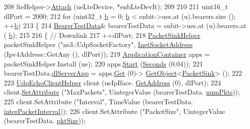 \begin{DoxyCode}
208           lteHelper->\hyperlink{classns3_1_1LteHelper_a9466743f826aa2652a87907b7f0a1c87}{Attach} (ueLteDevice, *enbLteDevIt);        
209       
210   
211           uint16\_t dlPort = 2000;          
212           \textcolor{keywordflow}{for} (uint32\_t \hyperlink{buildings__pathloss_8m_a21ad0bd836b90d08f4cf640b4c298e7c}{b} = 0; \hyperlink{buildings__pathloss_8m_a21ad0bd836b90d08f4cf640b4c298e7c}{b} < enbit->ues.at (u).bearers.size (); ++\hyperlink{buildings__pathloss_8m_a21ad0bd836b90d08f4cf640b4c298e7c}{b})
213             \{              
214               \hyperlink{structBearerTestData}{BearerTestData}& bearerTestData = enbit->ues.at (u).bearers.at (
      \hyperlink{buildings__pathloss_8m_a21ad0bd836b90d08f4cf640b4c298e7c}{b});
215               
216               \{ \textcolor{comment}{// Downlink}
217                 ++dlPort;
218                 \hyperlink{classns3_1_1PacketSinkHelper}{PacketSinkHelper} packetSinkHelper (\textcolor{stringliteral}{"ns3::UdpSocketFactory"}, 
      \hyperlink{classns3_1_1InetSocketAddress}{InetSocketAddress} (Ipv4Address::GetAny (), dlPort));
219                 \hyperlink{classns3_1_1ApplicationContainer}{ApplicationContainer} apps = packetSinkHelper.Install (ue);
220                 apps.\hyperlink{classns3_1_1ApplicationContainer_a8eff87926507020bbe3e1390358a54a7}{Start} (\hyperlink{group__timecivil_ga33c34b816f8ff6628e33d5c8e9713b9e}{Seconds} (0.04));
221                 bearerTestData.\hyperlink{structBearerTestData_a6a731d0528d513813da7c22c1d1e38c6}{dlServerApp} = apps.\hyperlink{classns3_1_1ApplicationContainer_a9e565807abd4213a56566a7ccd8d7509}{Get} (0)->
      \hyperlink{classns3_1_1Object_a13e18c00017096c8381eb651d5bd0783}{GetObject}<\hyperlink{classns3_1_1PacketSink}{PacketSink}> ();
222           
223                 \hyperlink{classns3_1_1UdpEchoClientHelper}{UdpEchoClientHelper} client (ueIpIface.
      \hyperlink{classns3_1_1Ipv4InterfaceContainer_ae63208dcd222be986822937ee4aa828c}{GetAddress} (0), dlPort);
224                 client.\hyperlink{classns3_1_1UdpEchoClientHelper_a11228c069ad896f8ed13f4d37c13f51d}{SetAttribute} (\textcolor{stringliteral}{"MaxPackets"}, UintegerValue (bearerTestData.
      \hyperlink{structBearerTestData_a2445558cf316cb91e159d8dbf098b700}{numPkts}));
225                 client.SetAttribute (\textcolor{stringliteral}{"Interval"}, TimeValue (bearerTestData.
      \hyperlink{structBearerTestData_a16179db57cfd8ca5e837da1384d5c03d}{interPacketInterval}));
226                 client.SetAttribute (\textcolor{stringliteral}{"PacketSize"}, UintegerValue (bearerTestData.
      \hyperlink{structBearerTestData_a247a1b66bdff7fb5079ddec1b07ff425}{pktSize}));

\end{DoxyCode}
